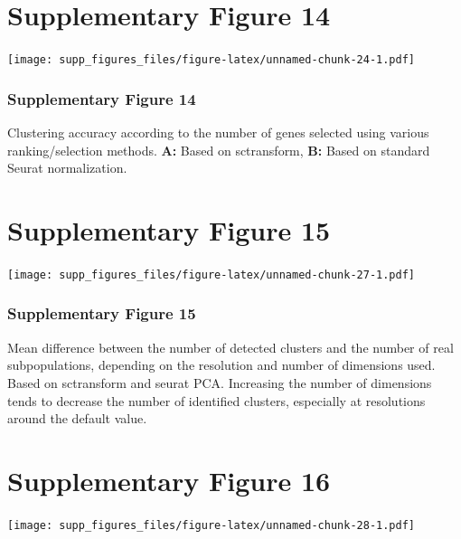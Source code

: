 \documentclass[]{article}
\begin{document}
\newpage

\hypertarget{supplementary-figure-14}{%
\section{Supplementary Figure 14}\label{supplementary-figure-14}}

\texttt{[image: supp\_figures\_files/figure-latex/unnamed-chunk-24-1.pdf]}

\hypertarget{supplementary-figure-14-1}{%
\subsubsection{Supplementary Figure
14}\label{supplementary-figure-14-1}}

Clustering accuracy according to the number of genes selected using
various ranking/selection methods. \textbf{A:} Based on sctransform,
\textbf{B:} Based on standard Seurat normalization.

\newpage

\hypertarget{supplementary-figure-15}{%
\section{Supplementary Figure 15}\label{supplementary-figure-15}}

\texttt{[image: supp\_figures\_files/figure-latex/unnamed-chunk-27-1.pdf]}

\hypertarget{supplementary-figure-15-1}{%
\subsubsection{Supplementary Figure
15}\label{supplementary-figure-15-1}}

Mean difference between the number of detected clusters and the number
of real subpopulations, depending on the resolution and number of
dimensions used. Based on sctransform and seurat PCA. Increasing the
number of dimensions tends to decrease the number of identified
clusters, especially at resolutions around the default value.

\newpage

\hypertarget{supplementary-figure-16}{%
\section{Supplementary Figure 16}\label{supplementary-figure-16}}

\texttt{[image: supp\_figures\_files/figure-latex/unnamed-chunk-28-1.pdf]}
\end{document}
